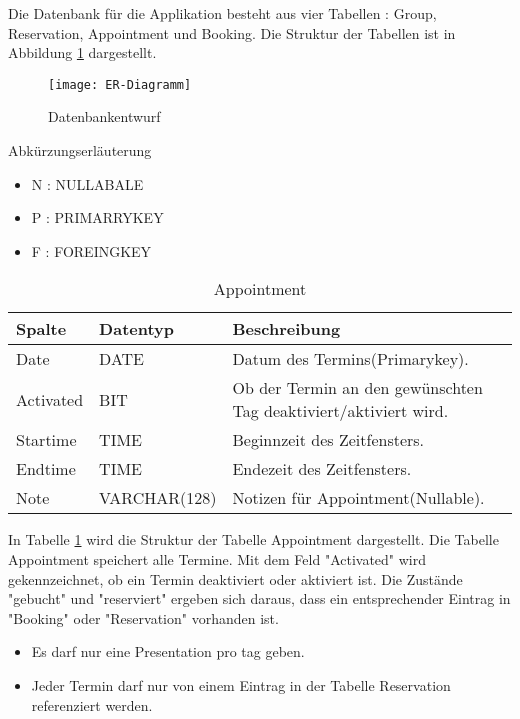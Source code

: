 \documentclass[10pt,a4paper]{article}
\begin{document}
Die Datenbank für die Applikation besteht aus vier Tabellen : Group, Reservation, Appointment und Booking.
Die Struktur der Tabellen ist in Abbildung \ref{fig:ER-Diagramm} dargestellt.

\begin{figure}[ht]		
	\centering
	\texttt{[image: ER-Diagramm]}
	\caption{Datenbankentwurf}
	\label{fig:ER-Diagramm}	
	\end{figure}

Abkürzungserläuterung
\begin{itemize}
\item N : NULLABALE
\item P : PRIMARRYKEY
\item F : FOREINGKEY
\end{itemize}

\begin{table}[h]
\centering
\caption{Appointment}
	\label{tab:Appointment}   
    \begin{tabular}{| l | l | l | l |}
    \hline
    \rowcolor{lightgray} Spalte & Datentyp & Beschreibung  \\ \hline
    Date  & DATE & Datum des Termins(Primarykey).\\ \hline
    Activated & BIT & Ob der Termin an den gewünschten Tag deaktiviert/aktiviert wird.\\ \hline
    Startime & TIME & Beginnzeit des Zeitfensters. \\ \hline
    Endtime & TIME & Endezeit des Zeitfensters.  \\ \hline
    Note & VARCHAR(128) & Notizen für Appointment(Nullable). \\ \hline
    \end{tabular}
\end{table}

In Tabelle \ref{tab:Appointment} wird die Struktur der Tabelle Appointment dargestellt. Die Tabelle Appointment speichert alle Termine. Mit dem Feld "Activated" wird gekennzeichnet, ob ein Termin deaktiviert oder aktiviert ist. Die Zustände "gebucht" und "reserviert" ergeben sich daraus, dass ein entsprechender Eintrag in "Booking" oder "Reservation" vorhanden ist.
\begin{itemize}
\item Es darf nur eine Presentation pro tag geben.
\item Jeder Termin darf nur von einem Eintrag in der Tabelle Reservation referenziert werden. 
\end{itemize}
\end{document}
